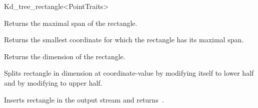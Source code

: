 \begin{ccRefClass}{Kd_tree_rectangle<PointTraits>}
\begin{ccAdvanced}
 
{Returns the maximal span of the rectangle.}

{Returns the smallest coordinate for which the rectangle has its maximal span.}

{Returns the dimension of the rectangle.}

{Splits rectangle in dimension  at coordinate-value  
 by modifying itself to lower half and by modifying  to upper half.} 


{Inserts rectangle  in the output stream  and returns~.}


\end{ccAdvanced}


\end{ccRefClass}


